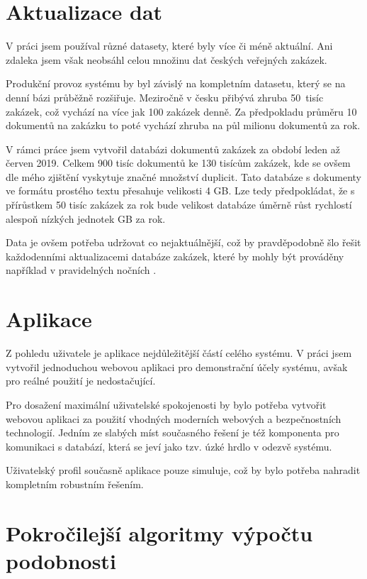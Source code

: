 \documentclass[thesis=M,czech]{FITthesis}[2019/12/23]
\begin{document}
\section{Aktualizace dat}

V práci jsem používal různé datasety, které byly více či méně aktuální. Ani zdaleka jsem však neobsáhl celou množinu dat českých veřejných zakázek. 

Produkční provoz systému by byl závislý na kompletním datasetu, který se na denní bázi průběžně rozšiřuje. Meziročně v česku přibývá zhruba 50~tisíc zakázek, což vychází na více jak 100 zakázek denně. Za předpokladu průměru 10 dokumentů na zakázku to poté vychází zhruba na půl milionu dokumentů za rok.

V rámci práce jsem vytvořil databázi dokumentů zakázek za období leden až červen 2019. Celkem 900 tisíc dokumentů ke 130 tisícům zakázek, kde se ovšem dle mého zjištění vyskytuje značné množství duplicit. Tato databáze s dokumenty ve formátu prostého textu přesahuje velikosti 4 GB. Lze tedy předpokládat, že s přírůstkem 50 tisíc zakázek za rok bude velikost databáze úměrně růst rychlostí alespoň nízkých jednotek GB za rok.

Data je ovšem potřeba udržovat co nejaktuálnější, což by pravděpodobně šlo řešit každodenními aktualizacemi databáze zakázek, které by mohly být prováděny například v pravidelných nočních .

\section{Aplikace}

Z pohledu uživatele je aplikace nejdůležitější částí celého systému. V práci jsem vytvořil jednoduchou webovou aplikaci pro demonstrační účely systému, avšak pro reálné použití je nedostačující.

Pro dosažení maximální uživatelské spokojenosti by bylo potřeba vytvořit webovou aplikaci za použití vhodných moderních webových a bezpečnostních technologií. Jedním ze slabých míst současného řešení je též komponenta pro komunikaci s databází, která se jeví jako tzv. úzké hrdlo v odezvě systému.

Uživatelský profil současně aplikace pouze simuluje, což by bylo potřeba nahradit kompletním robustním řešením.

\section{Pokročilejší algoritmy výpočtu podobnosti}
\end{document}
